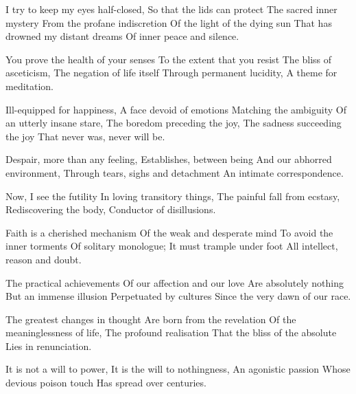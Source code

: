 \documentclass{article}
\newenvironment{stanza}{\begin{minipage}{10cm}\begin{internallinenumbers}\obeylines}{\end{internallinenumbers}\end{minipage}\vspace{\baselineskip}}
\begin{document}
\begin{stanza}
I try to keep my eyes half-closed,
So that the lids can protect
The sacred inner mystery
From the profane indiscretion
Of the light of the dying sun
That has drowned my distant dreams
Of inner peace and silence.
\end{stanza}

\begin{stanza}
You prove the health of your senses
To the extent that you resist
The bliss of asceticism,
The negation of life itself
Through permanent lucidity,
A theme for meditation.
\end{stanza}

\begin{stanza}
Ill-equipped for happiness,
A face devoid of emotions
Matching the ambiguity
Of an utterly insane stare,
The boredom preceding the joy,
The sadness succeeding the joy
That never was, never will be.
\end{stanza}

\begin{stanza}
Despair, more than any feeling,
Establishes, between being
And our abhorred environment,
Through tears, sighs and detachment
An intimate correspondence.
\end{stanza}

\begin{stanza}
Now, I see the futility
In loving transitory things,
The painful fall from ecstasy,
Rediscovering the body,
Conductor of disillusions.
\end{stanza}

\begin{stanza}
Faith is a cherished mechanism
Of the weak and desperate mind
To avoid the inner torments
Of solitary monologue;
It must trample under foot
All intellect, reason and doubt.
\end{stanza}

\begin{stanza}
The practical achievements
Of our affection and our love
Are absolutely nothing
But an immense illusion
Perpetuated by cultures
Since the very dawn of our race.
\end{stanza}

\begin{stanza}
The greatest changes in thought
Are born from the revelation
Of the meaninglessness of life,
The profound realisation
That the bliss of the absolute
Lies in renunciation.
\end{stanza}

\begin{stanza}
It is not a will to power,
It is the will to nothingness,
An agonistic passion
Whose devious poison touch
Has spread over centuries.
\end{stanza}
\end{document}
